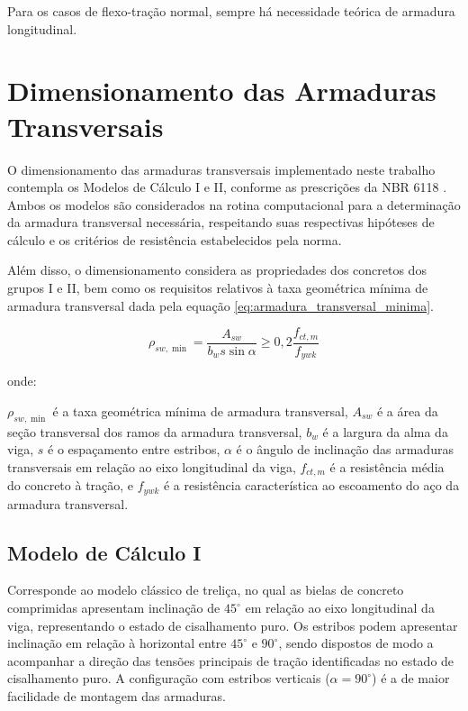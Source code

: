 Para os casos de flexo-tração normal, sempre há necessidade teórica de armadura longitudinal.

\section{Dimensionamento das Armaduras Transversais}

O dimensionamento das armaduras transversais implementado neste trabalho contempla os Modelos de Cálculo I e II, conforme as prescrições da NBR 6118 . Ambos os modelos são considerados na rotina computacional para a determinação da armadura transversal necessária, respeitando suas respectivas hipóteses de cálculo e os critérios de resistência estabelecidos pela norma.

Além disso, o dimensionamento considera as propriedades dos concretos dos grupos I e II, bem como os requisitos relativos à taxa geométrica mínima de armadura transversal dada pela equação \ref{eq:armadura_transversal_minima}.

\begin{equation}
\rho_{sw,\min} =
\frac{A_{sw}}{b_w s \sin\alpha}
\geq
0,2\frac{f_{ct,m}}{f_{ywk}}
\label{eq:armadura_transversal_minima}
\end{equation}

onde:

$\rho_{sw,\min}$ é a taxa geométrica mínima de armadura transversal, $A_{sw}$ é a área da seção transversal dos ramos da armadura transversal, $b_w$ é a largura da alma da viga, $s$ é o espaçamento entre estribos, $\alpha$ é o ângulo de inclinação das armaduras transversais em relação ao eixo longitudinal da viga, $f_{ct,m}$ é a resistência média do concreto à tração, e $f_{ywk}$ é a resistência característica ao escoamento do aço da armadura transversal.

\subsection{Modelo de Cálculo I}

Corresponde ao modelo clássico de treliça, no qual as bielas de concreto comprimidas apresentam inclinação de \(45^\circ\) em relação ao eixo longitudinal da viga, representando o estado de cisalhamento puro. Os estribos podem apresentar inclinação em relação à horizontal entre \(45^\circ\) e \(90^\circ\), sendo dispostos de modo a acompanhar a direção das tensões principais de tração identificadas no estado de cisalhamento puro. A configuração com estribos verticais (\(\alpha = 90^\circ\)) é a de maior facilidade de montagem das armaduras.

